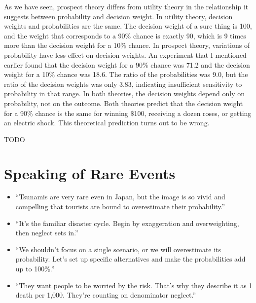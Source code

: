 \documentclass[11pt]{article}
\begin{document}
As we have seen, prospect theory differs from utility theory in the relationship it suggests between probability and decision weight. In utility theory, decision weights and probabilities are the same. The decision weight of a sure thing is 100, and the weight that corresponds to a 90\% chance is exactly 90, which is 9 times more than the decision weight for a 10\% chance. In prospect theory, variations of probability have less effect on decision weights. An experiment that I mentioned earlier found that the decision weight for a 90\% chance was 71.2 and the decision weight for a 10\% chance was 18.6. The ratio of the probabilities was 9.0, but the ratio of the decision weights was only 3.83, indicating insufficient sensitivity to probability in that range. In both theories, the decision weights depend only on probability, not on the outcome. Both theories predict that the decision weight for a 90\% chance is the same for winning \$100, receiving a dozen roses, or getting an electric shock. This theoretical prediction turns out to be wrong.

TODO

\section{Speaking of Rare Events}
\label{sec:orge2d9dfb}

\begin{itemize}
\item “Tsunamis are very rare even in Japan, but the image is so vivid and compelling that tourists are bound to overestimate their probability.”

\item “It’s the familiar disaster cycle. Begin by exaggeration and overweighting, then neglect sets in.”

\item “We shouldn’t focus on a single scenario, or we will overestimate its probability. Let’s set up specific alternatives and make the probabilities add up to 100\%.”

\item “They want people to be worried by the risk. That’s why they describe it as 1 death per 1,000. They’re counting on denominator neglect.”
\end{itemize}
\end{document}
